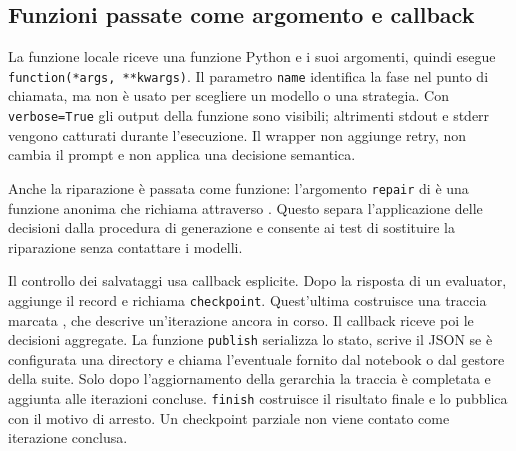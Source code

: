 \subsection{Funzioni passate come argomento e callback}
La funzione locale  riceve
una funzione Python e i suoi argomenti, quindi esegue
\texttt{function(*args, **kwargs)}. Il parametro \texttt{name} identifica la
fase nel punto di chiamata, ma non è usato per scegliere un modello o una
strategia. Con \texttt{verbose=True} gli output della funzione sono visibili;
altrimenti stdout e stderr vengono catturati durante l'esecuzione. Il wrapper
non aggiunge retry, non cambia il prompt e non applica una decisione semantica.

Anche la riparazione è passata come funzione: l'argomento \texttt{repair}
di  è una funzione anonima che richiama
 attraverso
. Questo separa l'applicazione delle decisioni dalla
procedura di generazione e consente ai test di sostituire la riparazione
senza contattare i modelli.

Il controllo dei salvataggi usa callback esplicite. Dopo la risposta di un
evaluator,  aggiunge il record e richiama
\texttt{checkpoint}. Quest'ultima costruisce una traccia marcata
, che descrive un'iterazione ancora in
corso. Il callback  riceve poi le decisioni
aggregate. La funzione \texttt{publish} serializza lo stato, scrive il JSON
se è configurata una directory e chiama l'eventuale 
fornito dal notebook o dal gestore della suite. Solo dopo l'aggiornamento
della gerarchia la traccia è completata e aggiunta alle iterazioni concluse.
\texttt{finish} costruisce il risultato finale e lo pubblica con il motivo
di arresto. Un checkpoint parziale non viene contato come iterazione conclusa.

